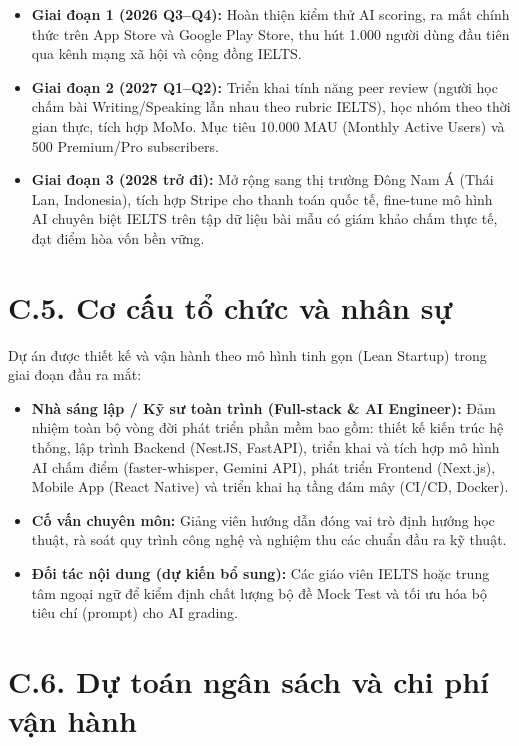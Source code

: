 \begin{itemize}
    \item \textbf{Giai đoạn 1 (2026 Q3--Q4):} Hoàn thiện kiểm thử AI scoring, ra mắt chính thức trên App Store và Google Play Store, thu hút 1.000 người dùng đầu tiên qua kênh mạng xã hội và cộng đồng IELTS.

    \item \textbf{Giai đoạn 2 (2027 Q1--Q2):} Triển khai tính năng peer review (người học chấm bài Writing/Speaking lẫn nhau theo rubric IELTS), học nhóm theo thời gian thực, tích hợp MoMo. Mục tiêu 10.000 MAU (Monthly Active Users) và 500 Premium/Pro subscribers.

    \item \textbf{Giai đoạn 3 (2028 trở đi):} Mở rộng sang thị trường Đông Nam Á (Thái Lan, Indonesia), tích hợp Stripe cho thanh toán quốc tế, fine-tune mô hình AI chuyên biệt IELTS trên tập dữ liệu bài mẫu có giám khảo chấm thực tế, đạt điểm hòa vốn bền vững.
\end{itemize}

\section*{C.5. Cơ cấu tổ chức và nhân sự}

Dự án được thiết kế và vận hành theo mô hình tinh gọn (Lean Startup) trong giai đoạn đầu ra mắt:
\begin{itemize}
    \item \textbf{Nhà sáng lập / Kỹ sư toàn trình (Full-stack \& AI Engineer):} Đảm nhiệm toàn bộ vòng đời phát triển phần mềm bao gồm: thiết kế kiến trúc hệ thống, lập trình Backend (NestJS, FastAPI), triển khai và tích hợp mô hình AI chấm điểm (faster-whisper, Gemini API), phát triển Frontend (Next.js), Mobile App (React Native) và triển khai hạ tầng đám mây (CI/CD, Docker).
    \item \textbf{Cố vấn chuyên môn:} Giảng viên hướng dẫn đóng vai trò định hướng học thuật, rà soát quy trình công nghệ và nghiệm thu các chuẩn đầu ra kỹ thuật.
    \item \textbf{Đối tác nội dung (dự kiến bổ sung):} Các giáo viên IELTS hoặc trung tâm ngoại ngữ để kiểm định chất lượng bộ đề Mock Test và tối ưu hóa bộ tiêu chí (prompt) cho AI grading.
\end{itemize}

\section*{C.6. Dự toán ngân sách và chi phí vận hành}

